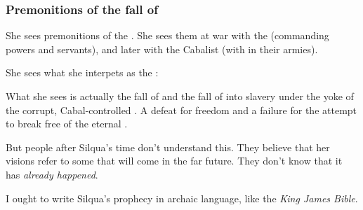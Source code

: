 \subsubsection{Premonitions of the fall of \Kezerad}
She sees premonitions of the . 
She sees them at war with the \Baelzerach{} (commanding \xsic{} powers and \daemonic{} servants), and later with the Cabalist \resphain{} (with \banes{} in their armies). 


She sees what she interpets as the :


What she sees is actually the fall of \Kezerad{} and the fall of \humanity{} into slavery under the yoke of the corrupt, Cabal-controlled \VaimonCaliphate. 
A defeat for freedom and a failure for the \Kezeradi{} attempt to break free of the eternal \Feud. 

But people after Silqua's time don't understand this. 
They believe that her visions refer to some  that will come in the far future. 
They don't know that it has \emph{already happened}. 

I ought to write Silqua's prophecy in archaic language, like the \emph{King James Bible}. 









